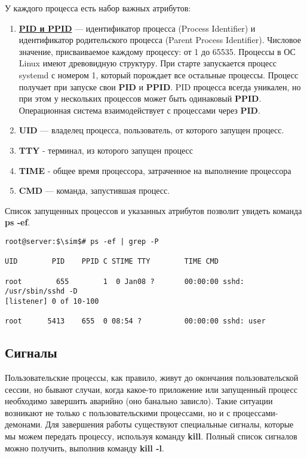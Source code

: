 \documentclass[14pt, a4paper]{article}
\begin{document}
У каждого процесса есть набор важных атрибутов:
\begin{enumerate}
    \item \href{https://rtfm.co.ua/unix-pid-ppid-i-nohup/}{\textbf{PID и PPID}} — идентификатор процесса (Process Identifier) и идентификатор родительского
    процесса (Parent Process Identifier). Числовое значение, присваиваемое каждому процессу: от
    1 до 65535. Процессы в ОС Linux имеют древовидную структуру. При старте запускается
    процесс systemd с номером 1, который порождает все остальные процессы. Процесс получает
    при запуске свои \textbf{PID} и \textbf{PPID}. PID процесса всегда уникален, но при этом у нескольких
    процессов может быть одинаковый \textbf{PPID}. Операционная система взаимодействует с
    процессами через \textbf{PID}.
    \item \textbf{UID} — владелец процесса, пользователь, от которого запущен процесс.
    \item \textbf{TTY} - терминал, из которого запущен процесс
    \item \textbf{TIME} - общее время процессора, затраченное на выполнение процессора
    \item \textbf{CMD} — команда, запустившая процесс.
\end{enumerate}

Список запущенных процессов и указанных атрибутов позволит увидеть команда \textbf{ps -ef}.
\vspace{0.3cm}

\begin{lstlisting}
root@server:$\sim$# ps -ef | grep -P

UID        PID    PPID C STIME TTY        TIME CMD

root        655        1  0 Jan08 ?       00:00:00 sshd: /usr/sbin/sshd -D
[listener] 0 of 10-100

root      5413    655  0 08:54 ?          00:00:00 sshd: user

\end{lstlisting}

\subsection*{Сигналы} 

Пользовательские процессы, как правило, живут до окончания пользовательской сессии, но бывают
случаи, когда какое-то приложение или запущенный процесс необходимо завершить аварийно (оно
банально зависло). Такие ситуации возникают не только с пользовательскими процессами, но и с
процессами-демонами. Для завершения работы существуют специальные сигналы, которые мы
можем передать процессу, используя команду \textbf{kill}. Полный список сигналов можно получить,
выполнив команду \textbf{kill -l}.\\
\end{document}
